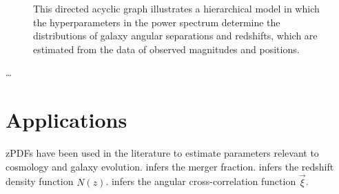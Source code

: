 \documentclass[12pt, onecolumn]{emulateapj}
\begin{document}
\begin{figure}
\label{fig:flow}
\vspace{0.5cm}
\begin{center}
\caption{This directed acyclic graph illustrates a hierarchical model in which the hyperparameters in the power spectrum determine the distributions of galaxy angular separations and redshifts, which are estimated from the data of observed magnitudes and positions.}
\end{center}
\end{figure}

\dots

\section{Applications}

zPDFs have been used in the literature to estimate parameters relevant to cosmology and galaxy evolution.  \citet{lop14} infers the merger fraction.  \citet{she11} infers the redshift density function $N(z)$.  \citet{mye09} infers the angular cross-correlation function $\vec{\xi}$.




\end{document}
